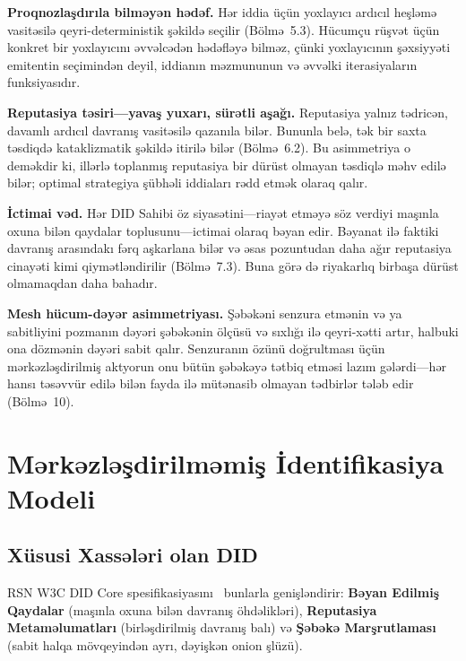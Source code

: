 \documentclass[11pt,a4paper,twocolumn]{article}
\begin{document}
\textbf{Proqnozlaşdırıla bilməyən hədəf.} Hər iddia üçün yoxlayıcı ardıcıl heşləmə vasitəsilə qeyri-deterministik şəkildə seçilir (Bölmə~5.3). Hücumçu rüşvət üçün konkret bir yoxlayıcını əvvəlcədən hədəfləyə bilməz, çünki yoxlayıcının şəxsiyyəti emitentin seçimindən deyil, iddianın məzmununun və əvvəlki iterasiyaların funksiyasıdır.

\textbf{Reputasiya təsiri---yavaş yuxarı, sürətli aşağı.} Reputasiya yalnız tədricən, davamlı ardıcıl davranış vasitəsilə qazanıla bilər. Bununla belə, tək bir saxta təsdiqdə kataklizmatik şəkildə itirilə bilər (Bölmə~6.2). Bu asimmetriya o deməkdir ki, illərlə toplanmış reputasiya bir dürüst olmayan təsdiqlə məhv edilə bilər; optimal strategiya şübhəli iddiaları rədd etmək olaraq qalır.

\textbf{İctimai vəd.} Hər DID Sahibi öz siyasətini---riayət etməyə söz verdiyi maşınla oxuna bilən qaydalar toplusunu---ictimai olaraq bəyan edir. Bəyanat ilə faktiki davranış arasındakı fərq aşkarlana bilər və əsas pozuntudan daha ağır reputasiya cinayəti kimi qiymətləndirilir (Bölmə~7.3). Buna görə də riyakarlıq birbaşa dürüst olmamaqdan daha bahadır.

\textbf{Mesh hücum-dəyər asimmetriyası.} Şəbəkəni senzura etmənin və ya sabitliyini pozmanın dəyəri şəbəkənin ölçüsü və sıxlığı ilə qeyri-xətti artır, halbuki ona dözmənin dəyəri sabit qalır. Senzuranın özünü doğrultması üçün mərkəzləşdirilmiş aktyorun onu bütün şəbəkəyə tətbiq etməsi lazım gələrdi---hər hansı təsəvvür edilə bilən fayda ilə mütənasib olmayan tədbirlər tələb edir (Bölmə~10).

\section{Mərkəzləşdirilməmiş İdentifikasiya Modeli}

\subsection{Xüsusi Xassələri olan DID}

RSN W3C DID Core spesifikasiyasını~\cite{did2022} bunlarla genişləndirir: \textbf{Bəyan Edilmiş Qaydalar} (maşınla oxuna bilən davranış öhdəlikləri), \textbf{Reputasiya Metaməlumatları} (birləşdirilmiş davranış balı) və \textbf{Şəbəkə Marşrutlaması} (sabit halqa mövqeyindən ayrı, dəyişkən onion şlüzü).
\end{document}
